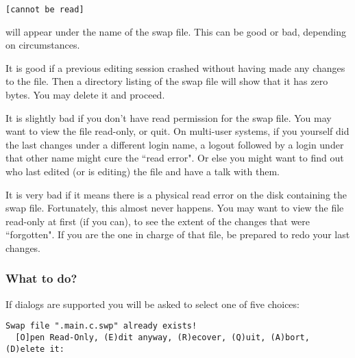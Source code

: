 \begin{Verbatim}[samepage=true]
    [cannot be read]
\end{Verbatim}

will appear under the name of the swap file.
This can be good or bad, depending on circumstances.

It is good if a previous editing session crashed without having made any changes to the file.
Then a directory listing of the swap file will show that it has zero bytes.
You may delete it and proceed.

It is slightly bad if you don't have read permission for the swap file.
You may want to view the file read-only, or quit.
On multi-user systems, if you yourself did the last changes under a different login name, a logout followed by a login under that other name might cure the ``read error".
Or else you might want to find out who last edited (or is editing) the file and have a talk with them.

It is very bad if it means there is a physical read error on the disk containing the swap file.
Fortunately, this almost never happens.
You may want to view the file read-only at first (if you can), to see the extent of the changes that were ``forgotten".
If you are the one in charge of that file, be prepared to redo your last changes.
\subsubsection{What to do?}
\label{swap-exists-choices}
If dialogs are supported you will be asked to select one of five choices:

\begin{Verbatim}[samepage=true]
  Swap file ".main.c.swp" already exists!
  [O]pen Read-Only, (E)dit anyway, (R)ecover, (Q)uit, (A)bort, (D)elete it:
\end{Verbatim}

